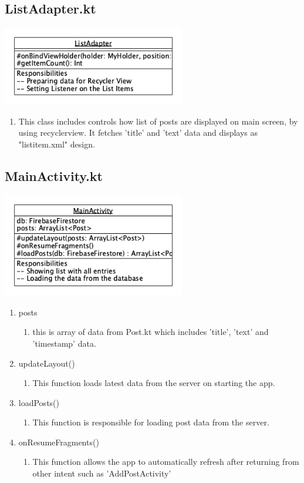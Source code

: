 \documentclass[conference]{IEEEtran}
\numberwithin{figure}{subsection}
\begin{document}
\subsection{ListAdapter.kt}
\includegraphics[width = 8cm]{bibtex/images/ListAdapter.png}
\begin{enumerate}
    \item This class includes controls how list of posts are displayed on main screen, by using recyclerview. It fetches 'title' and 'text' data and displays as "listitem.xml" design.
\end{enumerate}

\subsection{MainActivity.kt}
\includegraphics[width = 8cm]{bibtex/images/MainActivity.png}
\begin{enumerate}
    \item posts
    \begin{enumerate}
        \item this is array of data from Post.kt which includes 'title', 'text' and 'timestamp' data.
    \end{enumerate}
    \item updateLayout()
        \begin{enumerate}
            \item This function loads latest data from the server on starting the app.
        \end{enumerate}
    \item loadPosts()
        \begin{enumerate}
            \item This function is responsible for loading post data from the server.
        \end{enumerate}
    \item onResumeFragments()
        \begin{enumerate}
            \item This function allows the app to automatically refresh after returning from other intent such as 'AddPostActivity'
        \end{enumerate}
\end{enumerate}
\end{document}
